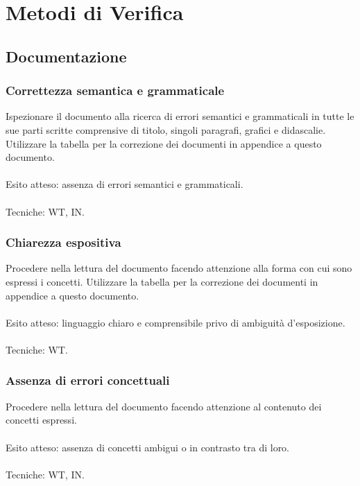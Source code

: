 \section{Metodi di Verifica}

\subsection{Documentazione}

\subsubsection*{Correttezza semantica e grammaticale}

Ispezionare il documento alla ricerca di errori semantici e grammaticali in
tutte le sue parti scritte comprensive di titolo, singoli paragrafi, grafici e didascalie.
Utilizzare la tabella per la correzione dei documenti in appendice a questo
documento.
\\\\
Esito atteso: assenza di errori semantici e grammaticali.
\\\\
Tecniche: WT, IN.

\subsubsection*{Chiarezza espositiva}

Procedere nella lettura del documento facendo attenzione alla forma con cui
sono espressi i concetti. Utilizzare la tabella per la correzione dei documenti
in appendice a questo documento.
\\\\
Esito atteso: linguaggio chiaro e comprensibile privo di ambiguit\`a
d'esposizione.
\\\\
Tecniche: WT.

\subsubsection*{Assenza di errori concettuali}

Procedere nella lettura del documento facendo attenzione al contenuto dei
concetti espressi.\\\\
Esito atteso: assenza di concetti ambigui o in contrasto tra di loro.
\\\\
Tecniche: WT, IN.

